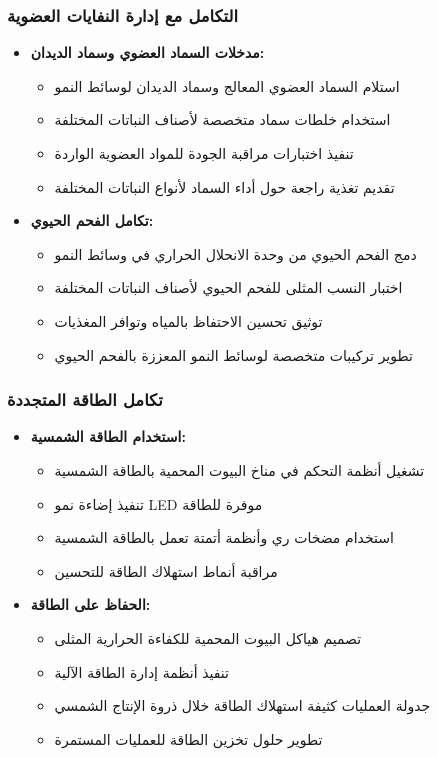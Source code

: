 \subsubsection{التكامل مع إدارة النفايات العضوية}
\begin{itemize}
    \item \textbf{مدخلات السماد العضوي وسماد الديدان:}
    \begin{itemize}
        \item استلام السماد العضوي المعالج وسماد الديدان لوسائط النمو
        \item استخدام خلطات سماد متخصصة لأصناف النباتات المختلفة
        \item تنفيذ اختبارات مراقبة الجودة للمواد العضوية الواردة
        \item تقديم تغذية راجعة حول أداء السماد لأنواع النباتات المختلفة
    \end{itemize}
    
    \item \textbf{تكامل الفحم الحيوي:}
    \begin{itemize}
        \item دمج الفحم الحيوي من وحدة الانحلال الحراري في وسائط النمو
        \item اختبار النسب المثلى للفحم الحيوي لأصناف النباتات المختلفة
        \item توثيق تحسين الاحتفاظ بالمياه وتوافر المغذيات
        \item تطوير تركيبات متخصصة لوسائط النمو المعززة بالفحم الحيوي
    \end{itemize}
\end{itemize}

\subsubsection{تكامل الطاقة المتجددة}
\begin{itemize}
    \item \textbf{استخدام الطاقة الشمسية:}
    \begin{itemize}
        \item تشغيل أنظمة التحكم في مناخ البيوت المحمية بالطاقة الشمسية
        \item تنفيذ إضاءة نمو LED موفرة للطاقة
        \item استخدام مضخات ري وأنظمة أتمتة تعمل بالطاقة الشمسية
        \item مراقبة أنماط استهلاك الطاقة للتحسين
    \end{itemize}
    
    \item \textbf{الحفاظ على الطاقة:}
    \begin{itemize}
        \item تصميم هياكل البيوت المحمية للكفاءة الحرارية المثلى
        \item تنفيذ أنظمة إدارة الطاقة الآلية
        \item جدولة العمليات كثيفة استهلاك الطاقة خلال ذروة الإنتاج الشمسي
        \item تطوير حلول تخزين الطاقة للعمليات المستمرة
    \end{itemize}
\end{itemize}

